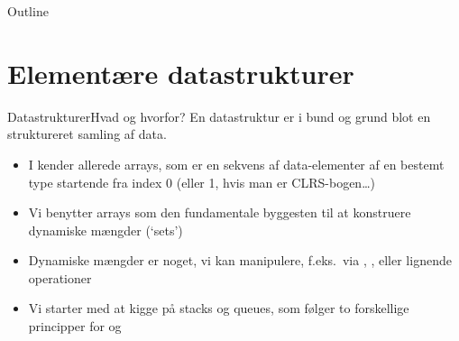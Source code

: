 \documentclass[aspectratio=1610]{beamer}
\begin{document}
\begin{frame}{Outline}
  \tableofcontents
\end{frame}


\section{Elementære datastrukturer}


\begin{frame}{Datastrukturer}{Hvad og hvorfor?}
    En datastruktur er i bund og grund blot en \alert{struktureret} samling af
    \alert{data}. \pause

    \begin{itemize}[<+->]
        \item I kender allerede \alert{arrays}, som er en sekvens af
            data-elementer af en bestemt type startende fra index 0 (eller 1,
            hvis man er CLRS-bogen\ldots)
        \item Vi benytter arrays som den fundamentale byggesten til at
            konstruere \alert{dynamiske mængder} (`sets')
        \item Dynamiske mængder er noget, vi kan manipulere, f.eks.\ via
            , ,  eller lignende
            operationer
        \item Vi starter med at kigge på \alert{stacks} og \alert{queues}, som
            følger to forskellige principper for  og 
    \end{itemize}
\end{frame}
\end{document}
